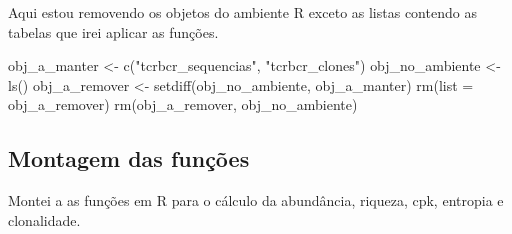 \documentclass[
  letterpaper,
  DIV=11,
  numbers=noendperiod]{scrartcl}
\newenvironment{Shaded}{\begin{snugshade}}{\end{snugshade}}
\newcommand{\AttributeTok}[1]{\textcolor[rgb]{0.40,0.45,0.13}{#1}}
\newcommand{\FunctionTok}[1]{\textcolor[rgb]{0.28,0.35,0.67}{#1}}
\newcommand{\NormalTok}[1]{\textcolor[rgb]{0.00,0.23,0.31}{#1}}
\newcommand{\OtherTok}[1]{\textcolor[rgb]{0.00,0.23,0.31}{#1}}
\newcommand{\StringTok}[1]{\textcolor[rgb]{0.13,0.47,0.30}{#1}}
\begin{document}
Aqui estou removendo os objetos do ambiente R exceto as listas contendo
as tabelas que irei aplicar as funções.

\begin{Shaded}
\begin{Highlighting}[]
\NormalTok{obj\_a\_manter }\OtherTok{\textless{}{-}} \FunctionTok{c}\NormalTok{(}\StringTok{"tcrbcr\_sequencias"}\NormalTok{, }\StringTok{"tcrbcr\_clones"}\NormalTok{)}
\NormalTok{obj\_no\_ambiente }\OtherTok{\textless{}{-}} \FunctionTok{ls}\NormalTok{()}
\NormalTok{obj\_a\_remover }\OtherTok{\textless{}{-}} \FunctionTok{setdiff}\NormalTok{(obj\_no\_ambiente, obj\_a\_manter)}
\FunctionTok{rm}\NormalTok{(}\AttributeTok{list =}\NormalTok{ obj\_a\_remover)}
\FunctionTok{rm}\NormalTok{(obj\_a\_remover, obj\_no\_ambiente)}
\end{Highlighting}
\end{Shaded}

\hypertarget{montagem-das-funuxe7uxf5es}{%
\subsection{Montagem das funções}\label{montagem-das-funuxe7uxf5es}}

Montei a as funções em R para o cálculo da abundância, riqueza, cpk,
entropia e clonalidade.
\end{document}
